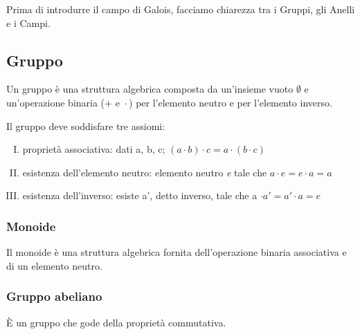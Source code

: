 \textsf{\small Prima di introdurre il campo di Galois, facciamo chiarezza tra i Gruppi, gli Anelli e i Campi.}


\subsection{Gruppo}

   

\textsf{\small Un gruppo è una struttura algebrica composta da un'insieme vuoto $\emptyset$ e un'operazione binaria ($+ \text{ e } \cdot$) per l'elemento neutro e per l'elemento inverso.}

\textsf{\small Il gruppo deve soddisfare tre assiomi:}

\begin{enumerate}[I.] %
	\item \textsf{\small proprietà associativa: dati a, b, c;  $(a \cdot b) \cdot c = a \cdot (b \cdot c)$}
	\item \textsf{\small esistenza dell'elemento neutro: elemento neutro \emph{e} tale che $a \cdot e = e \cdot a = a$}
	\item \textsf{\small esistenza dell'inverso: esiste a', detto inverso, tale che a $\cdot a' = a' \cdot a = e$}
\end{enumerate}

\subsubsection{Monoide}

   

\textsf{\small Il monoide è una struttura algebrica fornita dell'operazione binaria associativa e di un elemento neutro.}

\subsubsection{Gruppo abeliano}

  

\textsf{\small  È un gruppo che gode della proprietà commutativa.}

